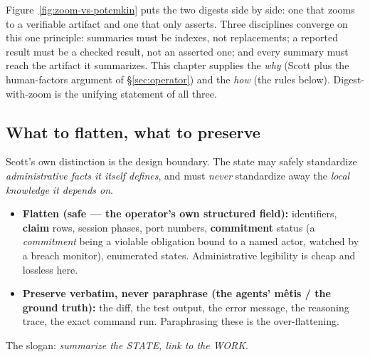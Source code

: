 \documentclass[11pt,a4paper]{article}
\theoremstyle{definition}
\theoremstyle{plain}
\begin{document}


Figure~\ref{fig:zoom-vs-potemkin} puts the two digests side by side: one that zooms
to a verifiable artifact and one that only asserts. Three disciplines converge on
this one principle: summaries must be indexes, not
replacements; a reported result must be a checked result, not an asserted one; and
every summary must reach the artifact it summarizes. This chapter supplies the
\emph{why} (Scott plus the human-factors argument of \S\ref{sec:operator}) and the
\emph{how} (the rules below). Digest-with-zoom is the unifying statement of all three.

\subsection{What to flatten, what to preserve}\label{sec:flatten}

Scott's own distinction is the design boundary. The state may safely standardize
\emph{administrative facts it itself defines}, and must \emph{never} standardize away
the \emph{local knowledge it depends on}.

\begin{itemize}[leftmargin=1.2em]
\item \textbf{Flatten (safe --- the operator's own structured field):} identifiers,
\textbf{claim} rows, session phases, port numbers, \textbf{commitment} status (a
\emph{commitment} being a violable obligation bound to a named actor, watched by a
breach monitor), enumerated states. Administrative legibility is cheap and lossless
here.
\item \textbf{Preserve verbatim, never paraphrase (the agents' m\^etis / the ground
truth):} the diff, the test output, the error message, the reasoning trace, the
exact command run. Paraphrasing these is the over-flattening.
\end{itemize}

The slogan: \emph{summarize the STATE, link to the WORK}.

\end{document}
